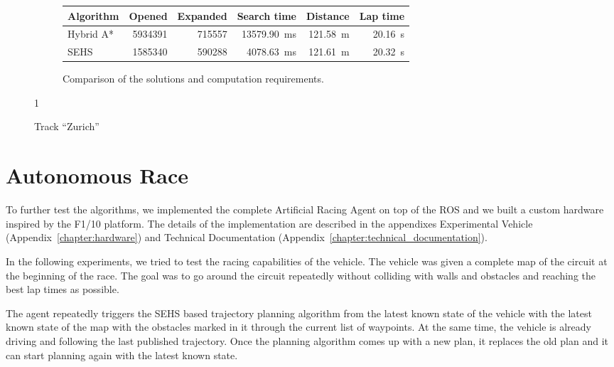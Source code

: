 \begin{figure}[!tbp]
	\vspace{0.75cm}
	
	\begin{subfigure}[t]{\textwidth}
		\centering
		\begin{tabular}{l r r r r r}%
			\toprule
			Algorithm & Opened & Expanded & Search time & Distance & Lap time \\
			\midrule
			Hybrid A* & \num{5934391} & \num{715557} & \SI{13579.90}{\milli\second} & \bftab \SI{121.58}{\meter} & \bftab \SI{20.16}{\second} \\
			\gls*{SEHS} & \bftab \num{1585340} & \bftab \num{590288} & \bftab \SI{4078.63}{\milli\second} & \SI{121.61}{\meter} & \SI{20.32}{\second} \\
			\bottomrule
		\end{tabular}
		\caption{Comparison of the solutions and computation requirements.}
		\label{table:zurich}
	\end{subfigure}
	
1	\vspace{0.75cm}

	\caption{Track ``Zurich''}
	\label{fig:zurich}
\end{figure}

\section{Autonomous Race}

To further test the algorithms, we implemented the complete Artificial Racing Agent on top of the \gls{ROS} and we built a custom hardware inspired by the F1/10 platform. The details of the implementation are described in the appendixes Experimental Vehicle (Appendix~\ref{chapter:hardware}) and Technical Documentation (Appendix~\ref{chapter:technical_documentation}).

In the following experiments, we tried to test the racing capabilities of the vehicle. The vehicle was given a complete map of the circuit at the beginning of the race. The goal was to go around the circuit repeatedly without colliding with walls and obstacles and reaching the best lap times as possible.

The agent repeatedly triggers the \gls{SEHS} based trajectory planning algorithm from the latest known state of the vehicle with the latest known state of the map with the obstacles marked in it through the current list of waypoints. At the same time, the vehicle is already driving and following the last published trajectory. Once the planning algorithm comes up with a new plan, it replaces the old plan and it can start planning again with the latest known state.

